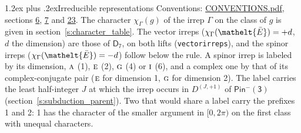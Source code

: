 \documentclass[10pt,a4paper]{article}
\makeatletter
\renewcommand\section{\@startsection{section}{1}{\z@}{-3ex plus -1ex minus -.2ex}%
  {1.2ex plus .2ex}{\normalfont\large\sffamily\bfseries\color{parttitle}}}
\numberwithin{equation}{section}
\newcommand{\eltfont}[1]{{\let\sigma\eltsigma\mathelt{#1}}}
\newcommand{\grp}[1]{\mathsf{#1}}
\newcommand{\irr}[1]{\text{\normalfont\scshape #1}}
\newcommand{\elt}[1]{\eltfont{#1}}
\newcommand{\irrJp}[2]{D^{(#1,#2)}}
\newcommand{\irchar}[1]{\chi_{#1}}
\newcommand{\barred}[1]{\bar{#1}}
\makeatother
\begin{document}
\section{Irreducible representations}\label{s:irreps}
Conventions: \href{../../CONVENTIONS.pdf}{CONVENTIONS.pdf}, sections \href{../../../rotation/CONVENTIONS.pdf\#conv.6}{6}, \href{../../../rotation/CONVENTIONS.pdf\#conv.7}{7} and \href{../../CONVENTIONS.pdf\#conv.23}{23}.
\leavevmode\label{n:function.character}\label{n:irrep.Gamma}The character $\irchar{\Gamma}(g)$ of the irrep $\Gamma$ on the class of $g$ is given in section~\ref{s:character_table}. \label{n:index.dimension}The vector irreps ($\irchar{\Gamma}(\elt{\barred{E}}) = +d$, $d$ the dimension) are those of \href{../../../rotation/data/pdf/D7.pdf}{$\grp{D_{7}}$}, on both lifts (\texttt{vectorirreps}), and the spinor irreps ($\irchar{\Gamma}(\elt{\barred{E}}) = -d$) follow below the rule. A spinor irrep is labeled by its dimension, $\irr{a}$ (1), $\irr{e}$ (2), $\irr{g}$ (4) or $\irr{i}$ (6), and a complex one by that of its complex-conjugate pair ($\irr{e}$ for dimension 1, $\irr{g}$ for dimension 2). The label carries the least half-integer $J$ at which the irrep occurs in $\irrJp{J}{+1}$ of $\grp{Pin^{-}(3)}$ (section~\ref{s:subduction_parent}). Two that would share a label carry the prefixes 1 and 2: 1 has the character of the smaller argument in $[0, 2\pi)$ on the first class with unequal characters.
\end{document}
